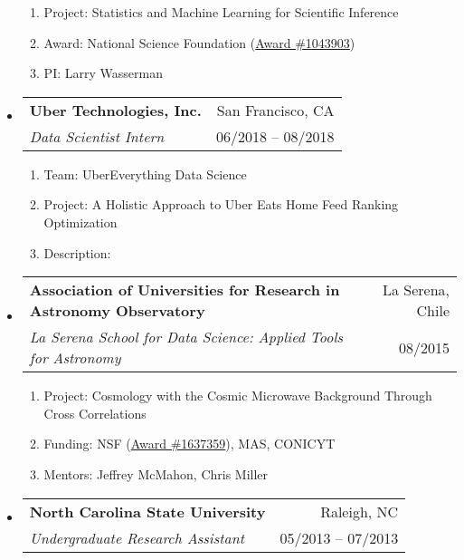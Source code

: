 \documentclass[letterpaper,10pt]{article}
\makeatletter
\newcommand{\subheadingtwolines}[4]{
\begin{tabular*}{6.45in}{l@{\cftdotfill{\cftsecdotsep}\extracolsep{\fill}}r}
#1 & #2 \\
#3 & #4 \\
\end{tabular*}}
\makeatother
\begin{document}
\begin{itemize}[leftmargin=0.4cm, itemsep=0.5cm]
\begin{enumerate}[leftmargin=0.5cm, itemsep=-0.05ex]
	\item[] Project: Statistics and Machine Learning for Scientific Inference
	\item[] Award: National Science Foundation (\href{https://www.nsf.gov/awardsearch/showAward?AWD_ID=1043903&HistoricalAwards=false}{Award \#1043903})
	\item[] PI: Larry Wasserman
\end{enumerate}


\item[] \subheadingtwolines{\bf Uber Technologies, Inc.}{San Francisco, CA}{\it Data Scientist Intern}{06/2018 -- 08/2018}

\begin{enumerate}[leftmargin=0.5cm, itemsep=-0.05ex]
	\item[] Team: UberEverything Data Science
	\item[] Project: A Holistic Approach to Uber Eats Home Feed Ranking Optimization
	\item[] Description:
\vspace{-0.1cm}
{}
\end{enumerate}


\item[] \subheadingtwolines{\bf Association of Universities for Research in Astronomy Observatory}{La Serena, Chile}{\it La Serena School for Data Science: Applied Tools for Astronomy}{08/2015}

\begin{enumerate}[leftmargin=0.5cm, itemsep=-0.05ex]
	\item[] Project: Cosmology with the Cosmic Microwave Background Through Cross Correlations
	\item[] Funding: NSF (\href{https://www.nsf.gov/awardsearch/showAward?AWD_ID=1637359&HistoricalAwards=false}{Award \#1637359}), MAS, CONICYT
	\item[] Mentors: Jeffrey McMahon, Chris Miller
\end{enumerate}


\item[] \subheadingtwolines{\bf North Carolina State University}{Raleigh, NC}{\it Undergraduate Research Assistant}{05/2013 -- 07/2013}


\end{itemize}
\end{document}
